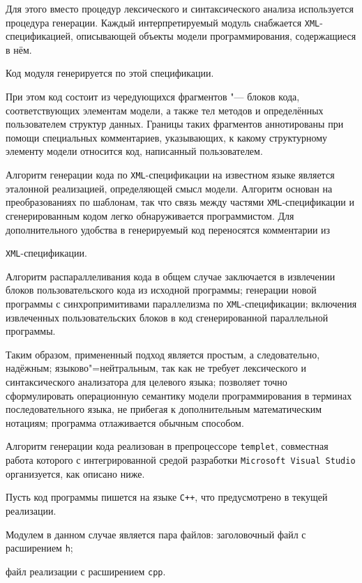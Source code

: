 Для этого вместо процедур лексического и синтаксического анализа используется процедура генерации. Каждый интерпретируемый модуль снабжается {\tt XML}-спецификацией, описывающей объекты модели программирования, содержащиеся в нём. 

Код модуля генерируется по этой спецификации. 

При этом код состоит из чередующихся фрагментов "--- блоков кода, соответствующих элементам модели, а также тел методов и определённых пользователем структур данных. Границы таких фрагментов аннотированы при помощи специальных комментариев, указывающих, к какому структурному элементу модели относится код, написанный пользователем. 

Алгоритм генерации кода по {\tt XML}-спецификации на известном языке является эталонной реализацией, определяющей смысл модели. Алгоритм основан на преобразованиях по шаблонам, так что связь между частями {\tt XML}-спецификации и сгенерированным кодом легко обнаруживается программистом. Для дополнительного удобства в генерируемый код переносятся комментарии из 

{\tt XML}-спецификации.



Алгоритм распараллеливания кода в общем случае заключается в извлечении блоков пользовательского кода из исходной программы; генерации новой программы с синхропримитивами параллелизма по {\tt XML}-спецификации; включения извлеченных пользовательских блоков в код сгенерированной параллельной программы.

Таким образом, примененный подход является простым, а следовательно, надёжным; языково"=нейтральным, так как не требует лексического и синтаксического анализатора для целевого языка; позволяет точно сформулировать операционную семантику модели программирования в терминах последовательного языка, не прибегая к дополнительным математическим нотациям; программа отлаживается обычным способом.



Алгоритм генерации кода реализован в препроцессоре {\tt templet}, совместная работа которого с интегрированной средой разработки {\tt Microsoft Visual Studio} организуется, как описано ниже. 

Пусть код программы пишется на языке {\tt C++}, что предусмотрено в текущей реализации. 

Модулем в данном случае является пара файлов: заголовочный файл с расширением {\tt h}; 

файл реализации с расширением {\tt cpp}. 

